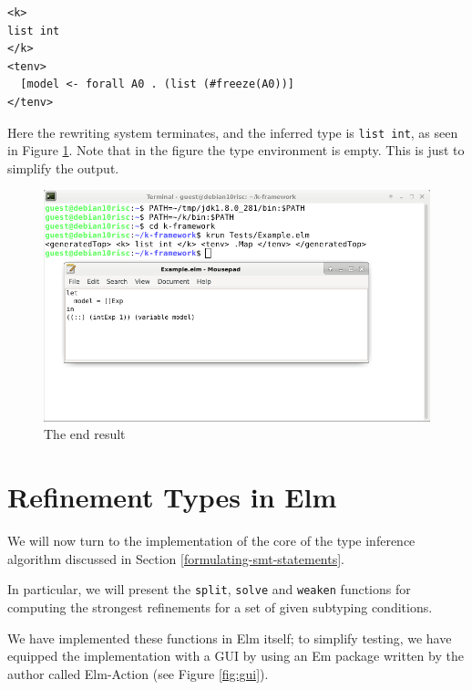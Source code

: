 \documentclass[]{scrbook}
\theoremstyle{definition}
\theoremstyle{definition}
\theoremstyle{definition}
\theoremstyle{remark}
\begin{document}
\begin{verbatim}
<k>
list int
</k>
<tenv>
  [model <- forall A0 . (list (#freeze(A0))]
</tenv>
\end{verbatim}

Here the rewriting system terminates, and the inferred type is
\texttt{list\ int}, as seen in Figure \ref{fig:k}. Note that in the
figure the type environment is empty. This is just to simplify the
output.

\begin{figure}

{\centering \includegraphics[width=0.75\linewidth]{k} 

}

\caption{The end result}\label{fig:k}
\end{figure}

\section{Refinement Types in Elm}\label{refinement-types-in-elm}

We will now turn to the implementation of the core of the type inference
algorithm discussed in Section \ref{formulating-smt-statements}.

In particular, we will present the \texttt{split}, \texttt{solve} and
\texttt{weaken} functions for computing the strongest refinements for a
set of given subtyping conditions.

We have implemented these functions in Elm itself; to simplify testing,
we have equipped the implementation with a GUI by using an Em package
written by the author called Elm-Action \cite{elmAction} (see Figure
\ref{fig:gui}).
\end{document}
